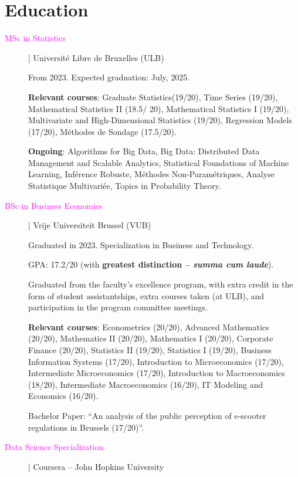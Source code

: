 \documentclass[12pt]{article}
\newcommand{\mycolor}{Fuchsia}
\newcommand{\thesectionicon}{}
\newcommand{\sectionicon}[1]{\renewcommand{\thesectionicon}{#1}}
\begin{document}
\sectionicon{\faGraduationCap}
\section{Education}

\begin{description}

\item[\textcolor{\mycolor}{MSc in Statistics}] | Université Libre de Bruxelles (ULB)

From 2023. Expected graduation: July, 2025.

\textbf{Relevant courses}: Graduate Statistics(19/20), Time Series (19/20), Mathematical Statistics II (18.5/ 20), Mathematical Statistics I (19/20), Multivariate and High-Dimensional Statistics (19/20), Regression Models (17/20), Méthodes de Sondage (17.5/20).
  
\textbf{Ongoing}: Algorithms for Big Data, Big Data: Distributed Data Management and Scalable Analytics, Statistical Foundations of Machine Learning, Inférence Robuste, Méthodes Non-Paramétriques, Analyse Statistique Multivariée, Topics in Probability Theory.

\item[\textcolor{\mycolor}{BSc in Business Economics}] | Vrije Universiteit Brussel (VUB)

Graduated in 2023. Specialization in Business and Technology.
  
GPA: 17.2/20 (with \textbf{greatest distinction -- \emph{summa cum laude}}).

Graduated from the faculty's excellence program, with extra credit in the form of student assistantships, extra courses taken (at ULB), and participation in the program committee meetings.

\textbf{Relevant courses}: Econometrics (20/20), Advanced Mathematics (20/20), Mathematics II (20/20), Mathematics I (20/20), Corporate Finance (20/20), Statistics II (19/20), Statistics I (19/20), Business Information Systems (17/20), Introduction to Microeconomics (17/20), Intermediate Microeconomics (17/20), Introduc\-tion to Macroeconomics (18/20), Intermediate Macroeconomics (16/20), IT Modeling and Economics (16/20).

Bachelor Paper: ``An analysis of the public perception of e-scooter regulations in Brussels (17/20)''.

\item[\textcolor{\mycolor}{Data Science Specialization}] | Coursera -- John Hopkins University
  

\end{description}
\end{document}

